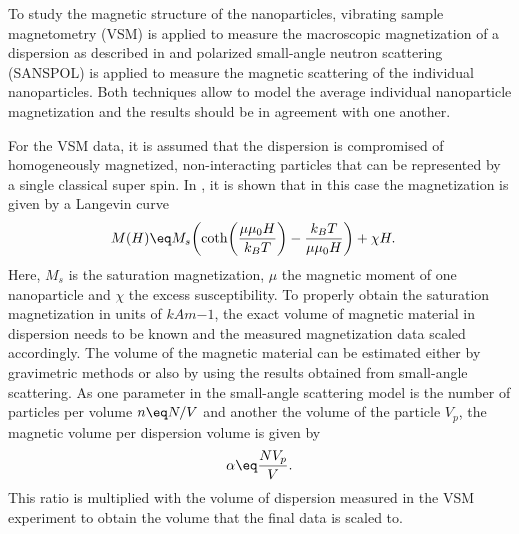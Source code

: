 \documentclass[\main/dresen_thesis.tex]{subfiles}
\begin{document}
    To study the magnetic structure of the nanoparticles, vibrating sample magnetometry (VSM) is applied to measure the macroscopic magnetization of a dispersion as described in  and polarized small-angle neutron scattering (SANSPOL) is applied to measure the magnetic scattering of the individual nanoparticles.
    Both techniques allow to model the average individual nanoparticle magnetization and the results should be in agreement with one another.

    For the VSM data, it is assumed that the dispersion is compromised of homogeneously magnetized, non-interacting particles that can be represented by a single classical super spin.
    In , it is shown that in this case the magnetization is given by a Langevin curve
    \begin{align}
      M(H) \eq& M_s \biggl( \coth \biggl(\frac{\mu \mu_0 H}{k_B T} \biggr) - \frac{k_B T}{\mu \mu_0 H} \biggr) + \chi H.
    \end{align}
    Here, $M_s$ is the saturation magnetization, $\mu$ the magnetic moment of one nanoparticle and $\chi$ the excess susceptibility.
    To properly obtain the saturation magnetization in units of $\unit{kAm{-1}}$, the exact volume of magnetic material in dispersion needs to be known and the measured magnetization data scaled accordingly.
    The volume of the magnetic material can be estimated either by gravimetric methods or also by using the results obtained from small-angle scattering.
    As one parameter in the small-angle scattering model is the number of particles per volume $n \eq N/V$ and another the volume of the particle $V_p$, the magnetic volume per dispersion volume is given by
    \begin{align}
      \alpha \eq \frac{N V_p}{V}.
    \end{align}
    This ratio is multiplied with the volume of dispersion measured in the VSM experiment to obtain the volume that the final data is scaled to.
  
\end{document}

